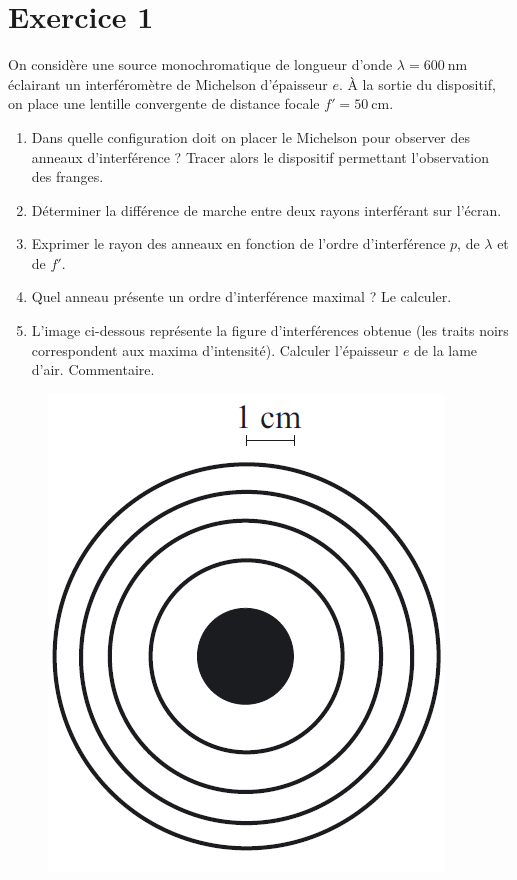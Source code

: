 \documentclass[a4paper,12pt,french]{article}
\begin{document}
\section{Exercice 1}

On considère une source monochromatique de longueur d'onde $\lambda = \SI{600}{\nano\meter}$ éclairant un interféromètre de Michelson d'épaisseur $e$. À la sortie du dispositif, on place une lentille convergente de distance focale $f'=\SI{50}{\centi\meter}$.

\begin{enumerate}
	\item Dans quelle configuration doit on placer le Michelson pour observer des anneaux d'interférence ? Tracer alors le dispositif permettant l'observation des franges.
	\item Déterminer la différence de marche entre deux rayons interférant sur l'écran.
	\item Exprimer le rayon des anneaux en fonction de l'ordre d'interférence $p$, de $\lambda$ et de $f'$.
	\item Quel anneau présente un ordre d'interférence maximal ? Le calculer.
	\item L'image ci-dessous représente la figure d'interférences obtenue (les traits noirs correspondent aux maxima d'intensité). Calculer l'épaisseur $e$ de la lame d'air. Commentaire.
\end{enumerate}

\begin{figure}[h]
	\centering
	\includegraphics[width=.6\textwidth]{ex_01.png}
\end{figure}
\end{document}
